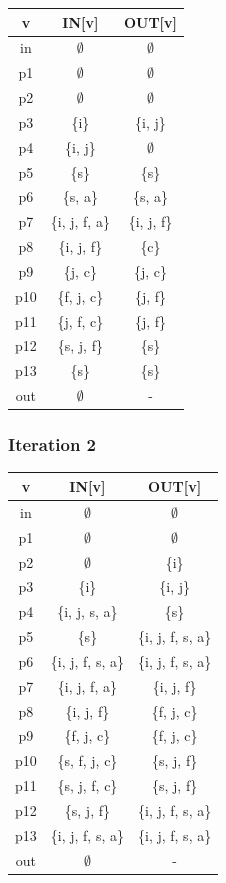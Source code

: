 \documentclass[11pt,a4paper]{article}
\begin{document}
    \begin{longtable}{| c | c | c |}
    \hline
    v & IN[v] & OUT[v] \\
    \hline
    in & $\emptyset$ & $\emptyset$ \\
    \hline
    p1 & $\emptyset$ & $\emptyset$ \\
    \hline
    p2 & $\emptyset$ & $\emptyset$ \\
    \hline
    p3 & \{i\} & \{i, j\} \\
    \hline
    p4 & \{i, j\} & $\emptyset$ \\
    \hline
    p5 & \{s\} & \{s\} \\
    \hline
    p6 & \{s, a\} & \{s, a\} \\
    \hline
    p7 & \{i, j, f, a\} & \{i, j, f\} \\
    \hline
    p8 & \{i, j, f\} & \{c\} \\
    \hline
    p9 & \{j, c\} & \{j, c\} \\
    \hline
    p10 & \{f, j, c\} & \{j, f\} \\
    \hline
    p11 & \{j, f, c\} & \{j, f\} \\
    \hline
    p12 & \{s, j, f\} & \{s\} \\
    \hline
    p13 & \{s\} & \{s\} \\
    \hline
    out & $\emptyset$ & - \\
    \hline
\end{longtable}

\subsubsection*{Iteration 2}

    \begin{longtable}{| c | c | c |}
    \hline
    v & IN[v] & OUT[v] \\
    \hline
    in & $\emptyset$ & $\emptyset$ \\
    \hline
    p1 & $\emptyset$ & $\emptyset$ \\
    \hline
    p2 & $\emptyset$ & \{i\} \\
    \hline
    p3 & \{i\} & \{i, j\} \\
    \hline
    p4 & \{i, j, s, a\} & \{s\} \\
    \hline
    p5 & \{s\} & \{i, j, f, s, a\} \\
    \hline
    p6 & \{i, j, f, s, a\} & \{i, j, f, s, a\} \\
    \hline
    p7 & \{i, j, f, a\} & \{i, j, f\} \\
    \hline
    p8 & \{i, j, f\} & \{f, j, c\} \\
    \hline
    p9 & \{f, j, c\} & \{f, j, c\} \\
    \hline
    p10 & \{s, f, j, c\} & \{s, j, f\} \\
    \hline
    p11 & \{s, j, f, c\} & \{s, j, f\} \\
    \hline
    p12 & \{s, j, f\} & \{i, j, f, s, a\} \\
    \hline
    p13 & \{i, j, f, s, a\} & \{i, j, f, s, a\} \\
    \hline
    out & $\emptyset$ & - \\
    \hline
\end{longtable}
\end{document}
